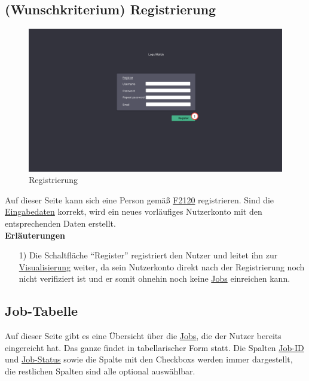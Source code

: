 \subsection{(Wunschkriterium) Registrierung}
\label{pages:register}
\begin{figure}[H]
    \centering
    \includegraphics[width=\textwidth]{images-interface/v4_interface/register_page_4.pdf}
    \caption{Registrierung}
    \label{fig:register}
\end{figure}
Auf dieser Seite kann sich eine Person gemäß \hyperref[FA:Web-Interface:Registrierung von Nutzern]{F2120} registrieren. Sind die \hyperref[PD:Registrierungsdaten]{Eingabedaten} korrekt, wird ein neues vorläufiges \gls{Nutzerkonto} mit den entsprechenden Daten erstellt. \\


\textbf{Erläuterungen}
\begin{itemize}
    \item[1)] Die Schaltfläche \enquote{Register} registriert den \gls{Nutzer} und leitet ihn zur \hyperref[pages:visualization]{Visualisierung} weiter, da sein \gls{Nutzerkonto} direkt nach der Registrierung noch nicht verifiziert ist und er somit ohnehin noch keine \hyperref[B:Jobs]{Jobs} einreichen kann.
\end{itemize}



\newpage
\subsection{Job-Tabelle}
\label{pages:job-table}
Auf dieser Seite gibt es eine Übersicht über die \hyperref[B:Jobs]{Jobs}, die der \gls{Nutzer} bereits eingereicht hat. Das ganze findet in tabellarischer Form statt. Die Spalten \hyperref[B:Job-ID]{Job-ID} und \hyperref[B:Job-Status]{Job-Status} sowie die Spalte mit den \glspl{Checkbox} werden immer dargestellt, die restlichen Spalten sind alle optional auswählbar.\\

